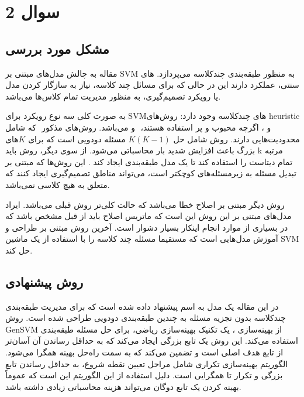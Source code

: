 \documentclass{article}
\begin{document}
	
	
	
	\tableofcontents \clearpage
	\listoffigures \clearpage
	\listoftables \clearpage
	\lstlistoflistings \clearpage
	\newpage
	
\section{سوال 2}


\subsection{مشکل مورد بررسی}

مقاله به چالش مدل‌های مبتنی بر SVM به منظور طبقه‌بندی چندکلاسه می‌پردازد.
های سنتی، عملکرد
دارند این در حالی که برای مسائل چند کلاسه، نیاز به سازگار کردن مدل یا رویکرد تصمیم‌گیری، به منظور مدیریت تمام کلاس‌ها می‌باشد. 

به صورت کلی سه نوع رویکرد برای SVMهای چندکلاسه وجود دارد: روش‌های 
heuristic
که شامل 
‎
 و 
  می‌باشد.
روش‌های مذکور 
‎
و
،
اگرچه محبوب و پر استفاده هستند، محدودیت‌هایی دارند. روش
شامل حل
$K(K-1)$ 
مسئله دودویی است که برای
$K$های
بزرگ باعث افزایش شدید بار محاسباتی می‌شود. از سوی دیگر، روش
باید k مرتبه تمام دیتاست را استفاده کند تا یک مدل طبقه‌بندی ایجاد کند . این روش‌ها که مبتنی بر تبدیل مسئله به زیرمسئله‌های کوچکتر است، می‌تواند مناطق تصمیم‌گیری ایجاد کنند که متعلق به هیچ کلاسی نمی‌باشد.

روش دیگر مبتنی بر اصلاح خطا می‌باشد که حالت کلی‌تر روش قبلی می‌باشد. ایراد مدل‌های مبتنی بر این روش این است که ماتریس اصلاح باید از قبل مشخص باشد که در بسیاری از موارد انجام اینکار بسیار دشوار است. آخرین روش مبتنی بر طراحی و آموزش مدل‌هایی است که مستقیما مسئله چند کلاسه را با استفاده از یک ماشین SVM حل کند.

\subsection{روش پیشنهادی}

در این مقاله یک مدل به اسم
پیشنهاد داده شده است که برای مدیریت طبقه‌بندی چندکلاسه بدون تجزیه مسئله به چندین طبقه‌بندی دودویی طراحی شده است. روش GenSVM از بهینه‌سازی
،
یک تکنیک بهینه‌سازی ریاضی، برای حل مسئله طبقه‌بندی استفاده می‌کند. این روش یک تابع بزرگی ایجاد می‌کند که به حداقل رساندن آن آسان‌تر از تابع هدف اصلی است و تضمین می‌کند که به سمت راه‌حل بهینه همگرا می‌شود. الگوریتم بهینه‌سازی تکراری شامل مراحل تعیین نقطه شروع، به حداقل رساندن تابع بزرگی و تکرار تا همگرایی است. دلیل استفاده از این الگوریتم این است که عموماً بهینه کردن یک تابع دوگان می‌تواند هزینه محاسباتی زیادی داشته باشد.
\end{document}

